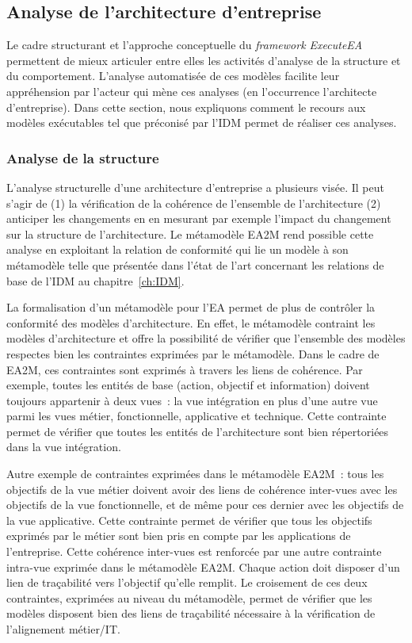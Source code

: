     \subsection{Analyse de l'architecture d'entreprise}
    \label{sec:analyse}
Le cadre structurant et l'approche conceptuelle du \emph{framework ExecuteEA} permettent de mieux articuler entre elles les activités d'analyse de la structure et du comportement. L'analyse automatisée de ces modèles facilite leur appréhension par l'acteur qui
mène ces analyses (en l'occurrence l'architecte d'entreprise). Dans cette section, nous expliquons comment le recours aux modèles exécutables tel que préconisé par l'IDM permet de réaliser ces analyses.

    \subsubsection{Analyse de la structure}


L'analyse structurelle d'une architecture d'entreprise a plusieurs visée. Il peut s'agir de (1) la
vérification de la cohérence de l'ensemble de l'architecture (2) anticiper les changements en
en mesurant par exemple l'impact du changement \cite{de2005change} sur la structure de l'architecture.
Le métamodèle EA2M rend possible cette analyse en exploitant la relation de conformité qui lie un modèle à son
métamodèle telle que présentée dans l'état de l'art concernant les relations de base de l'IDM
au chapitre~\ref{ch:IDM}. 

La formalisation d'un métamodèle pour l'EA permet de plus de
contrôler la conformité des modèles d'architecture. En effet, le métamodèle
contraint les modèles d'architecture et offre la possibilité de vérifier
que l'ensemble des modèles respectes bien les contraintes exprimées par le
métamodèle.
Dans le cadre de EA2M, ces contraintes sont exprimés à travers les liens
de cohérence. Par exemple, toutes les entités de base (action, objectif et information)
doivent toujours appartenir à deux vues~: la vue intégration en plus d'une autre vue
parmi les vues métier, fonctionnelle, applicative et technique. Cette contrainte permet de vérifier
que toutes les entités de l'architecture sont bien répertoriées dans la vue intégration.

Autre exemple de contraintes exprimées dans le métamodèle EA2M~: tous les objectifs de la vue métier
doivent avoir des liens de cohérence inter-vues avec les objectifs de la vue fonctionnelle, et de même pour ces dernier
avec les objectifs de la vue applicative. Cette contrainte permet de vérifier que tous les objectifs exprimés par le métier sont bien pris
en compte par les applications de l'entreprise. Cette cohérence inter-vues est renforcée par une autre contrainte intra-vue
exprimée dans le métamodèle EA2M. Chaque action doit disposer d'un lien de traçabilité vers l'objectif qu'elle remplit.
Le croisement  de ces deux contraintes, exprimées au niveau du métamodèle, permet de vérifier que les modèles disposent
bien des liens de traçabilité nécessaire à la vérification de l'alignement métier/IT.

